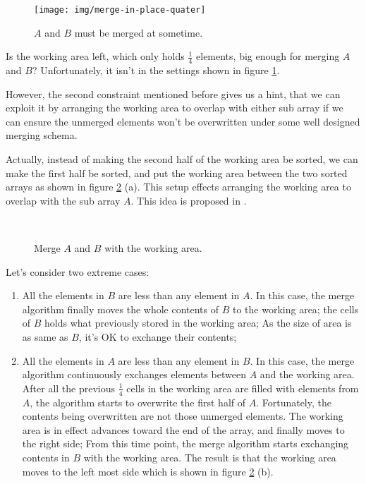 \documentclass[b5paper]{article}
\begin{document}
\begin{figure}[htbp]
 \centering
 \texttt{[image: img/merge-in-place-quater]}
 \caption{$A$ and $B$ must be merged at sometime.}
 \label{fig:merge-in-place-quater}
\end{figure}

Is the working area left, which only holds $\frac{1}{4}$ elements, big enough for merging
$A$ and $B$? Unfortunately, it isn't in the settings shown in figure \ref{fig:merge-in-place-quater}.

However, the second constraint mentioned before gives us a hint, that we can exploit
it by arranging the working area to overlap with either sub array if we can ensure
the unmerged elements won't be overwritten under some well designed merging schema.

Actually, instead of making the second half of the working area be sorted, we can make the first
half be sorted, and put the working area between the two sorted arrays as shown in figure
\ref{fig:merge-in-place-setup} (a).
This setup effects arranging the working area to overlap with the sub array $A$. This idea
is proposed in \cite{msort-in-place}.

\begin{figure}[htbp]
 \centering
  \\
 \caption{Merge $A$ and $B$ with the working area.}
 \label{fig:merge-in-place-setup}
\end{figure}

Let's consider two extreme cases:

\begin{enumerate}
\item All the elements in $B$ are less than any element in $A$. In this case, the merge algorithm
finally moves the whole contents of $B$ to the working area; the cells of $B$ holds what previously
stored in the working area; As the size of area is as same as $B$, it's OK to exchange their contents;
\item All the elements in $A$ are less than any element in $B$. In this case, the merge algorithm
continuously exchanges elements between $A$ and the working area. After all the previous $\frac{1}{4}$
cells in the working area are filled with elements from $A$, the algorithm starts to overwrite the
first half of $A$. Fortunately, the contents being overwritten are not those unmerged elements.
The working area is in effect advances toward the end of the array, and finally moves to the right
side; From this time point, the merge algorithm starts exchanging contents in $B$ with the working area.
The result is that the working area moves to the left most side which is shown in figure \ref{fig:merge-in-place-setup} (b).
\end{enumerate}
\end{document}
